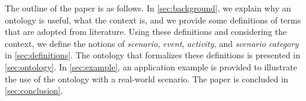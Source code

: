 The outline of the paper is as follows. In \cref{sec:background}, we explain why an ontology is useful, what the context is, and we provide some definitions of terms that are adopted from literature. 
Using these definitions and considering the context, we define the notions of \emph{scenario}, \emph{event}, \emph{activity}, and \emph{scenario category}  in \cref{sec:definitions}. 
The ontology that formalizes these definitions is presented in \cref{sec:ontology}. 
In \cref{sec:example}, an application example is provided to illustrate the use of the ontology with a real-world scenario. 
The paper is concluded in \cref{sec:conclusion}.
